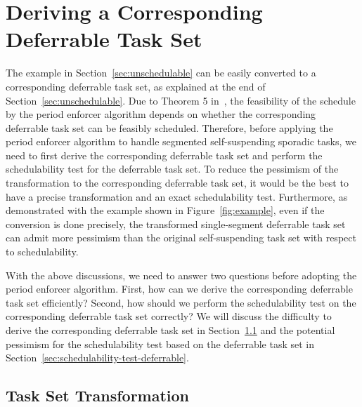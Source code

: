 
\section{Deriving a Corresponding Deferrable Task Set}
\label{sec:convert}

The example in Section~\ref{sec:unschedulable} can be easily converted to a corresponding deferrable task set, as explained at the end of Section~\ref{sec:unschedulable}.  Due to Theorem 5 in~\cite{Raj:suspension1991}, the feasibility of the schedule by the period enforcer algorithm depends on whether the corresponding deferrable task set can be feasibly scheduled. Therefore, before applying the period enforcer algorithm to handle segmented self-suspending sporadic tasks, we need to first derive the corresponding deferrable task set and perform the schedulability test for the deferrable task set. To reduce the pessimism of the transformation to the corresponding deferrable task set, it would be the best to have a precise transformation and an exact schedulability test. Furthermore, as demonstrated with the example shown in Figure~\ref{fig:example}, even if the conversion is done precisely, the transformed single-segment deferrable task set can admit more pessimism than the original self-suspending task set with respect to schedulability.


With the above discussions, we need to answer two questions before adopting the period enforcer algorithm. First, how can we derive the corresponding deferrable task set efficiently? Second, how should we perform the schedulability test on the corresponding deferrable task set correctly? We will discuss the difficulty to derive the corresponding deferrable task set in Section~\ref{sec:transformation-exponential} and the potential pessimism for the schedulability test based on the deferrable task set in Section~\ref{sec:schedulability-test-deferrable}.

\subsection{Task Set Transformation}
\label{sec:transformation-exponential}

